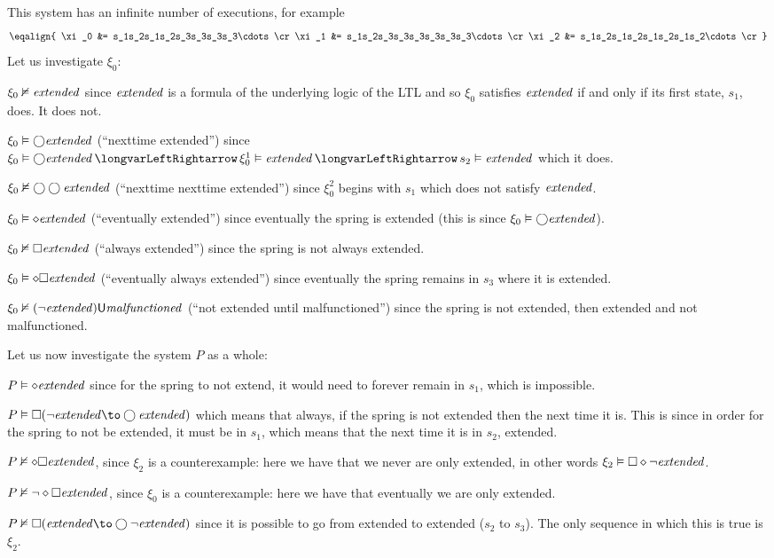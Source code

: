     This system has an infinite number of executions, for example
    $$ \eqalign{
        \xi_0 &= s_1s_2s_1s_2s_3s_3s_3s_3\cdots\cr
        \xi_1 &= s_1s_2s_3s_3s_3s_3s_3s_3\cdots\cr
        \xi_2 &= s_1s_2s_1s_2s_1s_2s_1s_2\cdots\cr
    } $$
    Let us investigate $\xi_0$:
    \benum
        \item $\xi_0\nvDash{\it extended}$ since ${\it extended}$ is a formula of the underlying logic of the LTL and so $\xi_0$ satisfies ${\it extended}$ if and only if its first state, $s_1$, does.
            It does not.
        \item $\xi_0\vDash\bigcirc{\it extended}$ (``nexttime extended'') since $\xi_0\vDash\bigcirc\ext\iff\xi_0^1\vDash\ext\iff s_2\vDash\ext$ which it does.
        \item $\xi_0\nvDash\bigcirc\bigcirc{\it extended}$ (``nexttime nexttime extended'') since $\xi_0^2$ begins with $s_1$ which does not satisfy ${\it extended}$.
        \item $\xi_0\vDash\diamond{\it extended}$ (``eventually extended'') since eventually the spring is extended (this is since $\xi_0\vDash\bigcirc{\it extended}$).
        \item $\xi_0\nvDash\square{\it extended}$ (``always extended'') since the spring is not always extended.
        \item $\xi_0\vDash\diamond\square{\it extended}$ (``eventually always extended'') since eventually the spring remains in $s_3$ where it is extended.
        \item $\xi_0\nvDash(\neg{\it extended}){\sf U}{\it malfunctioned}$ (``not extended until malfunctioned'') since the spring is not extended, then extended and not malfunctioned.
    \eenum

    Let us now investigate the system $P$ as a whole:
    \benum
        \item $P\vDash\diamond{\it extended}$ since for the spring to not extend, it would need to forever remain in $s_1$, which is impossible.
        \item $P\vDash\square(\neg\ext\to\bigcirc\ext)$ which means that always, if the spring is not extended then the next time it is.
            This is since in order for the spring to not be extended, it must be in $s_1$, which means that the next time it is in $s_2$, extended.
        \item $P\nvDash\diamond\square{\it extended}$, since $\xi_2$ is a counterexample: here we have that we never are only extended, in other words $\xi_2\vDash\square\diamond\neg{\it extended}$.
        \item $P\nvDash\neg\diamond\square{\it extended}$, since $\xi_0$ is a counterexample: here we have that eventually we are only extended.
        \item $P\nvDash\square(\ext\to\bigcirc\neg\ext)$ since it is possible to go from extended to extended ($s_2$ to $s_3$).
            The only sequence in which this is true is $\xi_2$.
    \eenum

